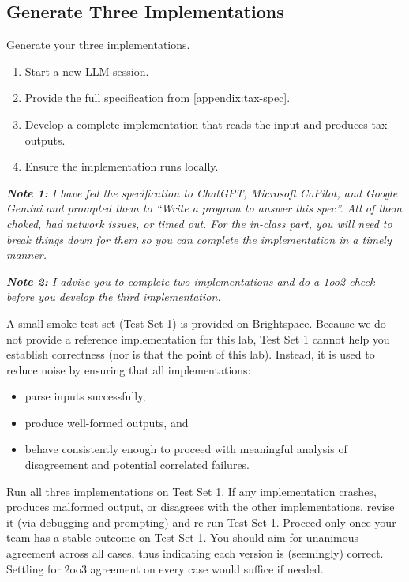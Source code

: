 \subsection{Generate Three Implementations}

Generate your three implementations.

\begin{enumerate}
  \item Start a new LLM session.
  \item Provide the full specification from \cref{appendix:tax-spec}.
  \item Develop a complete implementation that reads the input and produces tax outputs.
  \item Ensure the implementation runs locally.
\end{enumerate}

\textit{\textbf{Note 1:}
I have fed the specification to ChatGPT, Microsoft CoPilot, and Google Gemini and prompted them to ``Write a program to answer this spec''.
All of them choked, had network issues, or timed out.
For the in-class part, you will need to break things down for them so you can complete the implementation in a timely manner.}

\textit{\textbf{Note 2:}
I advise you to complete two implementations and do a 1oo2 check before you develop the third implementation.
}

A small smoke test set (Test Set 1) is provided on Brightspace.
Because we do not provide a reference implementation for this lab, Test Set 1 cannot help you establish correctness (nor is that the point of this lab).
Instead, it is used to reduce noise by ensuring that all implementations:

\begin{itemize}
  \item parse inputs successfully,
  \item produce well-formed outputs, and
  \item behave consistently enough to proceed with meaningful analysis of disagreement and potential correlated failures.

\end{itemize}

Run all three implementations on Test Set 1.
If any implementation crashes, produces malformed output, or disagrees with the other implementations, revise it (\eg via debugging and prompting) and re-run Test Set 1.
Proceed only once your team has a stable outcome on Test Set 1.
You should aim for unanimous agreement across all cases, thus indicating each version is (seemingly) correct.
Settling for 2oo3 agreement on every case would suffice if needed.

